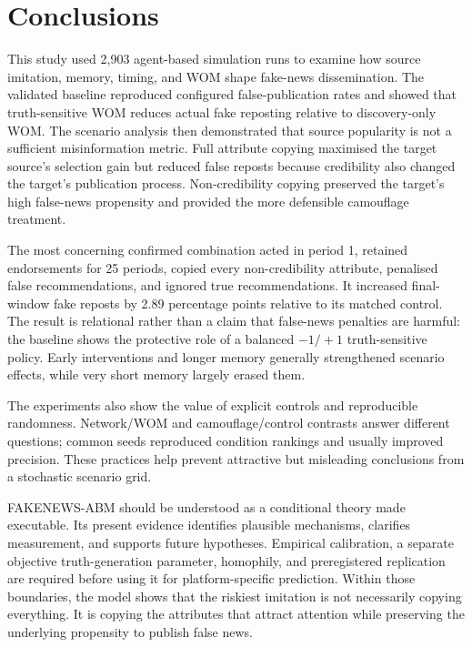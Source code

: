\section{Conclusions}
\label{sec:conclusions}

This study used 2,903 agent-based simulation runs to examine how source imitation, memory, timing, and WOM shape fake-news dissemination. The validated baseline reproduced configured false-publication rates and showed that truth-sensitive WOM reduces actual fake reposting relative to discovery-only WOM. The scenario analysis then demonstrated that source popularity is not a sufficient misinformation metric. Full attribute copying maximised the target source's selection gain but reduced false reposts because credibility also changed the target's publication process. Non-credibility copying preserved the target's high false-news propensity and provided the more defensible camouflage treatment.

The most concerning confirmed combination acted in period 1, retained endorsements for 25 periods, copied every non-credibility attribute, penalised false recommendations, and ignored true recommendations. It increased final-window fake reposts by 2.89 percentage points relative to its matched control. The result is relational rather than a claim that false-news penalties are harmful: the baseline shows the protective role of a balanced $-1/+1$ truth-sensitive policy. Early interventions and longer memory generally strengthened scenario effects, while very short memory largely erased them.

The experiments also show the value of explicit controls and reproducible randomness. Network/WOM and camouflage/control contrasts answer different questions; common seeds reproduced condition rankings and usually improved precision. These practices help prevent attractive but misleading conclusions from a stochastic scenario grid.

FAKENEWS-ABM should be understood as a conditional theory made executable. Its present evidence identifies plausible mechanisms, clarifies measurement, and supports future hypotheses. Empirical calibration, a separate objective truth-generation parameter, homophily, and preregistered replication are required before using it for platform-specific prediction. Within those boundaries, the model shows that the riskiest imitation is not necessarily copying everything. It is copying the attributes that attract attention while preserving the underlying propensity to publish false news.
